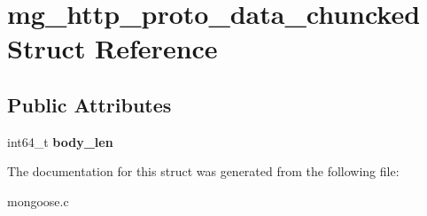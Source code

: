\hypertarget{structmg__http__proto__data__chuncked}{}\section{mg\+\_\+http\+\_\+proto\+\_\+data\+\_\+chuncked Struct Reference}
\label{structmg__http__proto__data__chuncked}
\subsection*{Public Attributes}
\begin{DoxyCompactItemize}
\item 
\mbox{\label{structmg__http__proto__data__chuncked_aeee1125c8814977f3cd571d8db611053}} 
int64\+\_\+t {\bfseries body\+\_\+len}
\end{DoxyCompactItemize}


The documentation for this struct was generated from the following file\+:\begin{DoxyCompactItemize}
\item 
mongoose.\+c\end{DoxyCompactItemize}
